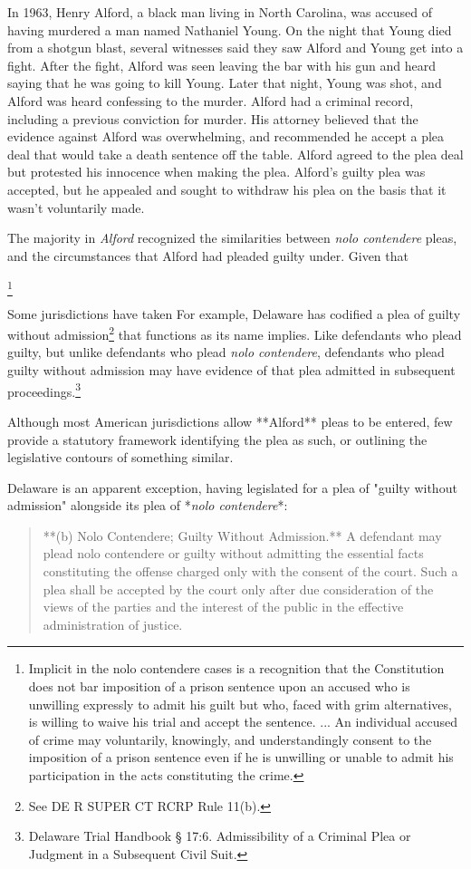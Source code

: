In 1963, Henry Alford, a black man living in North Carolina, was accused of having murdered a man named Nathaniel Young. On the night that Young died from a shotgun blast, several witnesses said they saw Alford and Young get into a fight. After the fight, Alford was seen leaving the bar with his gun and heard saying that he was going to kill Young. Later that night, Young was shot, and Alford was heard confessing to the murder. Alford had a criminal record, including a previous conviction for murder. His attorney believed that the evidence against Alford was overwhelming, and recommended he accept a plea deal that would take a death sentence off the table. Alford agreed to the plea deal but protested his innocence when making the plea. Alford’s guilty plea was accepted, but he appealed and sought to withdraw his plea on the basis that it wasn’t voluntarily made.

The majority in \textit{Alford} recognized the similarities between \textit{nolo contendere} pleas, and the circumstances that Alford had pleaded guilty under. Given that 

\footnote{Implicit in the nolo contendere cases is a recognition that the Constitution does not bar imposition of a prison sentence upon an accused who is unwilling expressly to admit his guilt but who, faced with grim alternatives, is willing to waive his trial and accept the sentence. ... An individual accused of crime may voluntarily, knowingly, and understandingly consent to the imposition of a prison sentence even if he is unwilling or unable to admit his participation in the acts constituting the crime.} 


Some jurisdictions have taken For example, Delaware has codified a plea of guilty without admission\footnote{See DE R SUPER CT RCRP Rule 11(b).} that functions as its name implies. Like defendants who plead guilty, but unlike defendants who plead \textit{nolo contendere}, defendants who plead guilty without admission may have evidence of that plea admitted in subsequent proceedings.\footnote{Delaware Trial Handbook § 17:6. Admissibility of a Criminal Plea or Judgment in a Subsequent Civil Suit.}

Although most American jurisdictions allow **Alford** pleas to be entered, few provide a statutory framework identifying the plea as such, or outlining the legislative contours of something similar.

Delaware is an apparent exception, having legislated for a plea of "guilty without admission" alongside its plea of *\textit{nolo contendere}*:
\begin{quote}
    **(b) Nolo Contendere; Guilty Without Admission.** A defendant may plead nolo contendere or guilty without admitting the essential facts constituting the offense charged only with the consent of the court. Such a plea shall be accepted by the court only after due consideration of the views of the parties and the interest of the public in the effective administration of justice.
\end{quote}

